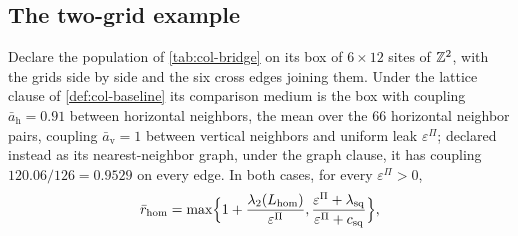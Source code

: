 \subsection{The two-grid example}\label{sup:col-the-two-grid-example}

\begin{observation}\label{obs:col-bridge-baseline}
Declare the population of \cref{tab:col-bridge} on its box of $6\times12$ sites of $\mathbb{Z}^2$, with the grids side by side and the six cross edges joining them. Under the lattice clause of \cref{def:col-baseline} its comparison medium is the box with coupling $\bar a_{\mathrm h}=0.91$ between horizontal neighbors, the mean over the $66$ horizontal neighbor pairs, coupling $\bar a_{\mathrm v}=1$ between vertical neighbors and uniform leak $\varepsilon^\Pi$; declared instead as its nearest-neighbor graph, under the graph clause, it has coupling $120.06/126=0.9529$ on every edge. In both cases, for every $\varepsilon^\Pi>0$,
\begin{equation}\label{eq:col-bridge-baseline}
\bar r_{\mathrm{hom}}=\max\Bigl\{1+\frac{\lambda_2(L_{\mathrm{hom}})}{\varepsilon^\Pi},\frac{\varepsilon^\Pi+\lambda_{\mathrm{sq}}}{\varepsilon^\Pi+c_{\mathrm{sq}}}\Bigr\},
\end{equation}

\end{observation}
